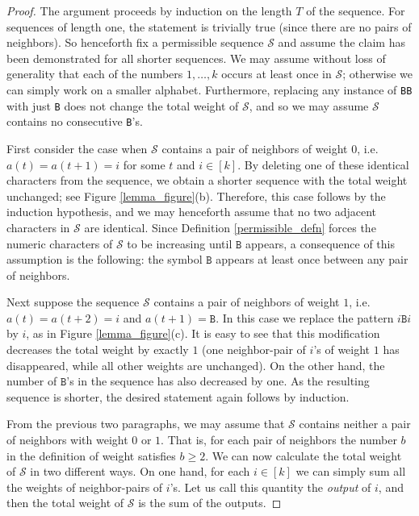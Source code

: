 \documentclass[11pt,reqno]{amsart} %
\numberwithin{equation}{section}
\newcommand{\s}{\mathcal{S}}
\theoremstyle{definition}
\begin{document}
\begin{proof}
The argument proceeds by induction on the length $T$ of the sequence. 
For sequences of length one, the statement is trivially true (since there are no pairs of neighbors). 
So henceforth fix a permissible sequence $\s$ and assume the claim has been demonstrated for all shorter sequences. 
We may assume without loss of generality that each of the numbers $1,\dots,k$ occurs at least once in $\s$; otherwise we can simply work on a smaller alphabet.
Furthermore, replacing any instance of \texttt{BB} with just \texttt{B} does not change the total weight of $\s$, and so we may assume $\s$ contains no consecutive \texttt{B}'s.

First consider the case when $\s$ contains a pair of neighbors of weight $0$, i.e.~$a(t) = a({t+1}) = i$ for some $t$ and $i \in [k]$.
By deleting one of these identical characters from the sequence, we obtain a shorter sequence with the total weight unchanged; see Figure \ref{lemma_figure}(b).
Therefore, this case follows by the induction hypothesis, and we may henceforth assume that no two adjacent characters in $\s$ are identical.
Since Definition \ref{permissible_defn} forces the numeric characters of $\s$ to be increasing until $\texttt{B}$ appears, a consequence of this assumption is the following: the symbol $\texttt{B}$ appears at least once between any pair of neighbors.

Next suppose the sequence $\s$ contains a pair of neighbors of weight $1$, i.e. $a(t) = a({t+2}) = i$ and $a({t+1}) = \texttt{B}$.
In this case we replace the pattern $i\texttt{B}i$ by $i$, as in Figure \ref{lemma_figure}(c).
It is easy to see that this modification decreases the total weight by exactly $1$ (one neighbor-pair of $i$'s of weight $1$ has disappeared, while all other weights are unchanged). On the other hand, the number of $\texttt{B}$'s in the sequence has also decreased by one.
As the resulting sequence is shorter, the desired statement again follows by induction.

From the previous two paragraphs, we may assume that $\s$ contains neither a pair of neighbors with weight $0$ or $1$. %
That is, for each pair of neighbors the number $b$ in the definition of weight satisfies $b\geq 2$.
We can now calculate the total weight of $\s$ in two different ways.
On one hand, for each $i \in [k]$ we can simply sum all the weights of neighbor-pairs of $i$'s.
Let us call this quantity the \textit{output} of $i$, and then the total weight of $\s$ is the sum of the outputs.


\end{proof}
\end{document}
